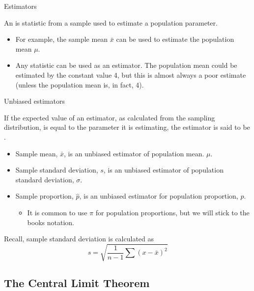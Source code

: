 \documentclass[xcolor=table, handout]{beamer}
\begin{document}
\begin{frame}{Estimators}
\begin{block}{}
\large An  is statistic from a sample used to estimate a population parameter. 
\begin{itemize}
\pause\item For example, the sample mean $\bar x$ can be used to estimate the population mean $\mu$.
\pause\item Any statistic can be used as an estimator. The population mean could be estimated by the constant value 4, but this is almost always a poor estimate (unless the population mean is, in fact, 4).
\end{itemize}
\end{block}
\end{frame}

\begin{frame}{Unbiased estimators}
\begin{block}{}
\large If the expected value of an estimator, as calculated from the sampling distribution, is equal to the parameter it is estimating, the estimator is said to be . 
\begin{itemize}
\pause\item Sample mean, $\bar x$, is an unbiased estimator of population mean. $\mu$.
\pause\item Sample standard deviation, $s$, is an unbiased estimator of population standard deviation, $\sigma$.
\pause\item Sample proportion, $\hat p$, is an unbiased estimator for population proportion, $p$.
\begin{itemize}
\item It is common to use $\pi$ for population proportions, but we will stick to the books notation. 
\end{itemize}
\end{itemize}
\end{block}

\pause
\begin{alertblock}{}
Recall, sample standard deviation is calculated as 
\[s = \sqrt{\frac 1 {n-1} \sum (x - \bar x)^2}\]
\end{alertblock}
\end{frame}

\subsection{The Central Limit Theorem}
\end{document}
